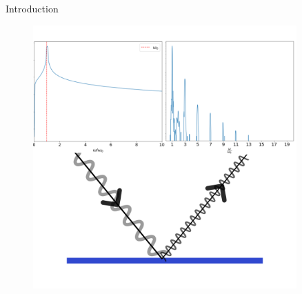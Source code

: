 \documentclass{beamer}
\begin{document}
\begin{frame}{Introduction}
\begin{minipage}[h]{0.48\linewidth}
\begin{figure}
            \includegraphics[width=0.9\textwidth, height=0.42\textheight]{images/harmonics.png}
            \label{fig:harmonics}
        \end{figure}
    \end{minipage}
\end{frame}
\end{document}
